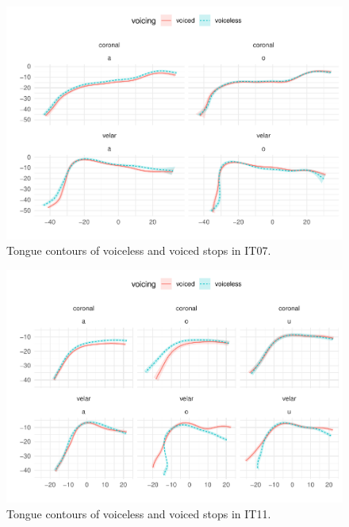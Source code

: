\documentclass[11pt,]{article}
\begin{document}
\begin{figure}

{\centering \includegraphics[width=.8\textwidth]{2018-polar-gam_files/figure-latex/Figure11} 

}

\caption{Tongue contours of voiceless and voiced stops in IT07.}\label{f:Figure11}
\end{figure}

\begin{figure}

{\centering \includegraphics[width=.8\textwidth]{2018-polar-gam_files/figure-latex/Figure12} 

}

\caption{Tongue contours of voiceless and voiced stops in IT11.}\label{f:Figure12}
\end{figure}
\end{document}
